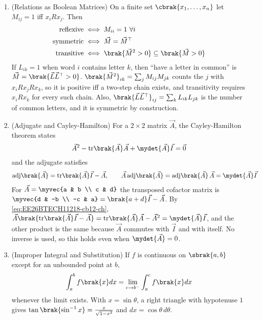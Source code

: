 \begin{enumerate}[label=\thesubsection.\arabic*, ref=\thesubsection.\theenumi,itemsep=1.5em]
\item (Relations as Boolean Matrices) On a finite set $\cbrak{x_1,\dots,x_n}$ let $M_{ij}=1$ iff $x_iRx_j$. Then
\begin{align}
\text{reflexive} &\iff M_{ii}=1\ \forall i \nonumber \\
\text{symmetric} &\iff \vec{M}=\vec{M}^{\top} \nonumber \\
\text{transitive} &\iff \brak{\vec{M}^2>0}\subseteq\brak{\vec{M}>0}
\label{eq:EE26BTECH11218-cb12-relation}
\end{align}
If $L_{ik}=1$ when word $i$ contains letter $k$, then ``have a letter in common'' is $\vec{M}=\brak{\vec{L}\vec{L}^{\top}>0}$.
\solution $\brak{\vec{M}^2}_{ik}=\sum_jM_{ij}M_{jk}$ counts the $j$ with $x_iRx_jRx_k$, so it is positive iff a two-step chain exists, and transitivity requires $x_iRx_k$ for every such chain. Also, $\brak{\vec{L}\vec{L}^{\top}}_{ij}=\sum_kL_{ik}L_{jk}$ is the number of common letters, and it is symmetric by construction.

\item (Adjugate and Cayley-Hamilton) For a $2\times2$ matrix $\vec{A}$, the Cayley-Hamilton theorem states
\begin{align}
\vec{A}^2-\mathrm{tr}\brak{\vec{A}}\vec{A}+\mydet{\vec{A}}\vec{I}=\vec{0}
\label{eq:EE26BTECH11218-cb12-ch}
\end{align}
and the adjugate satisfies
\begin{align}
\mathrm{adj}\brak{\vec{A}} = \mathrm{tr}\brak{\vec{A}}\vec{I}-\vec{A}, \qquad \vec{A}\,\mathrm{adj}\brak{\vec{A}} = \mathrm{adj}\brak{\vec{A}}\,\vec{A} = \mydet{\vec{A}}\vec{I}
\label{eq:EE26BTECH11218-cb12-adj}
\end{align}
\solution For $\vec{A}=\myvec{a & b \\ c & d}$ the transposed cofactor matrix is $\myvec{d & -b \\ -c & a} = \brak{a+d}\vec{I}-\vec{A}$. By \eqref{eq:EE26BTECH11218-cb12-ch}, $\vec{A}\brak{\mathrm{tr}\brak{\vec{A}}\vec{I}-\vec{A}} = \mathrm{tr}\brak{\vec{A}}\vec{A}-\vec{A}^2 = \mydet{\vec{A}}\vec{I}$, and the other product is the same because $\vec{A}$ commutes with $\vec{I}$ and with itself. No inverse is used, so this holds even when $\mydet{\vec{A}}=0$.

\item (Improper Integral and Substitution) If $f$ is continuous on $\sbrak{a,b}$ except for an unbounded point at $b$,
\begin{align}
\int_a^bf\brak{x}dx = \lim_{c\to b^{-}}\int_a^cf\brak{x}dx
\label{eq:EE26BTECH11218-cb12-improper}
\end{align}
whenever the limit exists. With $x=\sin\theta$, a right triangle with hypotenuse $1$ gives $\tan\brak{\sin^{-1}x}=\frac{x}{\sqrt{1-x^2}}$ and $dx=\cos\theta\,d\theta$.


\end{enumerate}
